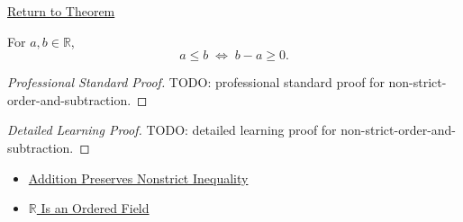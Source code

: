 \newpage
{}
\label{prf:non-strict-order-and-subtraction}

\begin{remark*}[Return]
\hyperref[lem:non-strict-order-and-subtraction]{Return to Theorem}
\end{remark*}

\begin{lemma*}
For $a,b\in\mathbb{R}$,
\[
a\le b \;\Longleftrightarrow\; b-a\ge 0.
\]
\end{lemma*}

\begin{proof}[Professional Standard Proof]
\LRAProofBodyStart
TODO: professional standard proof for non-strict-order-and-subtraction.
\end{proof}

\begin{proof}[Detailed Learning Proof]
\LRAProofBodyStart
TODO: detailed learning proof for non-strict-order-and-subtraction.
\end{proof}

\begin{remark*}
\end{remark*}

\begin{dependencies}
\begin{itemize}
  \item \hyperref[thm:ineq-nonstrict-add-both-sides]{Addition Preserves Nonstrict Inequality}
  \item \hyperref[thm:r-is-an-ordered-field]{$\mathbb{R}$ Is an Ordered Field}
\end{itemize}
\end{dependencies}

\clearpage
